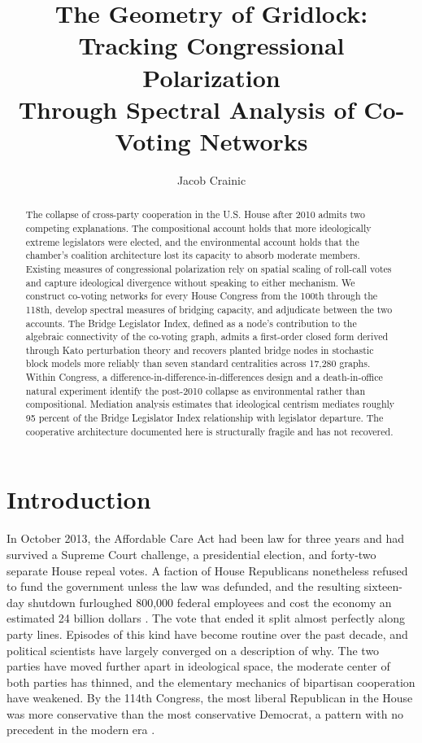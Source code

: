 \documentclass[12pt, a4paper]{article}
\title{\textbf{The Geometry of Gridlock: Tracking Congressional Polarization\\ Through Spectral Analysis of Co-Voting Networks}}
\author{Jacob Crainic}
\date{}
\begin{document}
\raggedbottom

\maketitle

\begin{abstract}
The collapse of cross-party cooperation in the U.S. House after 2010 admits two competing explanations. The compositional account holds that more ideologically extreme legislators were elected, and the environmental account holds that the chamber's coalition architecture lost its capacity to absorb moderate members. Existing measures of congressional polarization rely on spatial scaling of roll-call votes and capture ideological divergence without speaking to either mechanism. We construct co-voting networks for every House Congress from the 100th through the 118th, develop spectral measures of bridging capacity, and adjudicate between the two accounts. The Bridge Legislator Index, defined as a node's contribution to the algebraic connectivity of the co-voting graph, admits a first-order closed form derived through Kato perturbation theory and recovers planted bridge nodes in stochastic block models more reliably than seven standard centralities across 17,280 graphs. Within Congress, a difference-in-difference-in-differences design and a death-in-office natural experiment identify the post-2010 collapse as environmental rather than compositional. Mediation analysis estimates that ideological centrism mediates roughly 95 percent of the Bridge Legislator Index relationship with legislator departure. The cooperative architecture documented here is structurally fragile and has not recovered.
\end{abstract}

\section{Introduction}

In October 2013, the Affordable Care Act had been law for three years and had survived a Supreme Court challenge, a presidential election, and forty-two separate House repeal votes. A faction of House Republicans nonetheless refused to fund the government unless the law was defunded, and the resulting sixteen-day shutdown furloughed 800,000 federal employees and cost the economy an estimated 24 billion dollars \citep{cbo2013}. The vote that ended it split almost perfectly along party lines. Episodes of this kind have become routine over the past decade, and political scientists have largely converged on a description of why. The two parties have moved further apart in ideological space, the moderate center of both parties has thinned, and the elementary mechanics of bipartisan cooperation have weakened. By the 114th Congress, the most liberal Republican in the House was more conservative than the most conservative Democrat, a pattern with no precedent in the modern era \citep{poole2017}.
\end{document}
